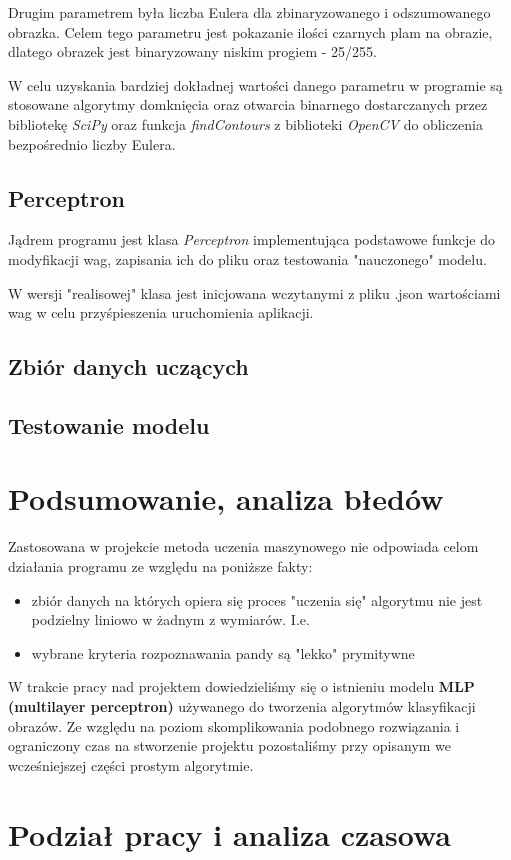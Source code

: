 \documentclass[polish,12pt]{article}
\begin{document}
Drugim parametrem była liczba Eulera dla zbinaryzowanego i odszumowanego obrazka. Celem tego parametru jest pokazanie ilości czarnych plam na obrazie, dlatego obrazek jest binaryzowany niskim progiem - 25/255.

W celu uzyskania bardziej dokładnej wartości danego parametru w programie są stosowane algorytmy domknięcia oraz otwarcia binarnego dostarczanych przez bibliotekę \textit{SciPy} oraz funkcja \textit{findContours} z biblioteki \textit{OpenCV} do obliczenia bezpośrednio liczby Eulera.

\subsection{Perceptron}
Jądrem programu jest klasa \textit{Perceptron} implementująca podstawowe funkcje do modyfikacji wag, zapisania ich do pliku oraz testowania "nauczonego" modelu. 

W wersji "realisowej" klasa jest inicjowana wczytanymi z pliku .json wartościami wag w celu przyśpieszenia uruchomienia aplikacji.


\subsection{Zbiór danych uczących}



\subsection{Testowanie modelu}


\section{Podsumowanie, analiza błedów}

Zastosowana w projekcie metoda uczenia maszynowego nie odpowiada celom działania programu ze względu na poniższe fakty:

\begin{itemize}
    \item zbiór danych na których opiera się proces "uczenia się" algorytmu nie jest podzielny liniowo w żadnym z wymiarów. I.e. 
    \item wybrane kryteria rozpoznawania pandy są "lekko" prymitywne 
\end{itemize}

W trakcie pracy nad projektem dowiedzieliśmy się o istnieniu modelu \textbf{MLP (multilayer perceptron)} używanego do tworzenia algorytmów klasyfikacji obrazów. Ze względu na poziom skomplikowania podobnego rozwiązania i ograniczony czas na stworzenie projektu pozostaliśmy przy opisanym we wcześniejszej części prostym algorytmie.

\section{Podział pracy i analiza czasowa}
\end{document}

